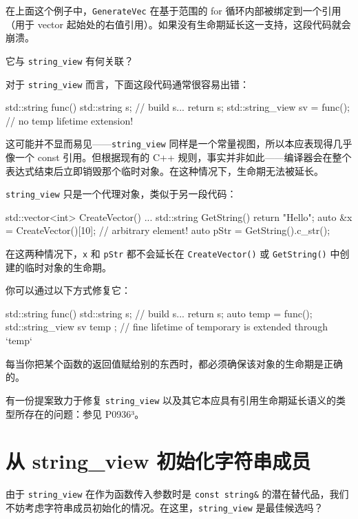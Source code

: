 在上面这个例子中，\texttt{GenerateVec} 在基于范围的 for 循环内部被绑定到一个引用（用于 vector 起始处的右值引用）。如果没有生命期延长这一支持，这段代码就会崩溃。

它与 \texttt{string\_view} 有何关联？

对于 \texttt{string\_view} 而言，下面这段代码通常很容易出错：

\begin{codebox}[cpp]
std::string func()
{
std::string s;
// build s...
return s;
}
std::string_view sv = func();
// no temp lifetime extension!
\end{codebox}

这可能并不显而易见——\texttt{string\_view} 同样是一个常量视图，所以本应表现得几乎像一个 const 引用。但根据现有的 C++ 规则，事实并非如此——编译器会在整个表达式结束后立即销毁那个临时对象。在这种情况下，生命期无法被延长。

\texttt{string\_view} 只是一个代理对象，类似于另一段代码：

\begin{codebox}[cpp]
std::vector<int> CreateVector() { ... }
std::string GetString() { return "Hello"; }
auto &x = CreateVector()[10]; // arbitrary element!
auto pStr = GetString().c_str();
\end{codebox}

在这两种情况下，\texttt{x} 和 \texttt{pStr} 都不会延长在 \texttt{CreateVector()} 或 \texttt{GetString()} 中创建的临时对象的生命期。

你可以通过以下方式修复它：

\begin{codebox}[cpp]
std::string func()
{
std::string s;
// build s...
return s;
}
auto temp = func();
std::string_view sv { temp };
// fine lifetime of temporary is extended through `temp`
\end{codebox}

每当你把某个函数的返回值赋给别的东西时，都必须确保该对象的生命期是正确的。

有一份提案致力于修复 \texttt{string\_view} 以及其它本应具有引用生命期延长语义的类型所存在的问题：参见 P0936³。


\section{从 string\_view 初始化字符串成员}

由于 \texttt{string\_view} 在作为函数传入参数时是 \texttt{const string\&} 的潜在替代品，我们不妨考虑字符串成员初始化的情况。在这里，\texttt{string\_view} 是最佳候选吗？

